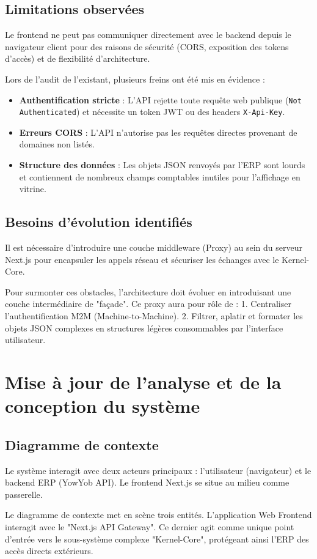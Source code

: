 \documentclass[12pt, a4paper]{report}
\begin{document}
\section{Limitations observées}
Le frontend ne peut pas communiquer directement avec le backend depuis le navigateur client pour des raisons de sécurité (CORS, exposition des tokens d'accès) et de flexibilité d'architecture.

Lors de l'audit de l'existant, plusieurs freins ont été mis en évidence :
\begin{itemize}
    \item \textbf{Authentification stricte} : L'API rejette toute requête web publique (\texttt{Not Authenticated}) et nécessite un token JWT ou des headers \texttt{X-Api-Key}.
    \item \textbf{Erreurs CORS} : L'API n'autorise pas les requêtes directes provenant de domaines non listés.
    \item \textbf{Structure des données} : Les objets JSON renvoyés par l'ERP sont lourds et contiennent de nombreux champs comptables inutiles pour l'affichage en vitrine.
\end{itemize}
\section{Besoins d'évolution identifiés}
Il est nécessaire d'introduire une couche middleware (Proxy) au sein du serveur Next.js pour encapsuler les appels réseau et sécuriser les échanges avec le Kernel-Core.

Pour surmonter ces obstacles, l'architecture doit évoluer en introduisant une couche intermédiaire de "façade". Ce proxy aura pour rôle de :
1. Centraliser l'authentification M2M (Machine-to-Machine).
2. Filtrer, aplatir et formater les objets JSON complexes en structures légères consommables par l'interface utilisateur.
\chapter{Mise à jour de l'analyse et de la conception du système}
\section{Diagramme de contexte}
Le système interagit avec deux acteurs principaux : l'utilisateur (navigateur) et le backend ERP (YowYob API). Le frontend Next.js se situe au milieu comme passerelle.

Le diagramme de contexte met en scène trois entités. L'application Web Frontend interagit avec le "Next.js API Gateway". Ce dernier agit comme unique point d'entrée vers le sous-système complexe "Kernel-Core", protégeant ainsi l'ERP des accès directs extérieurs.
\end{document}
